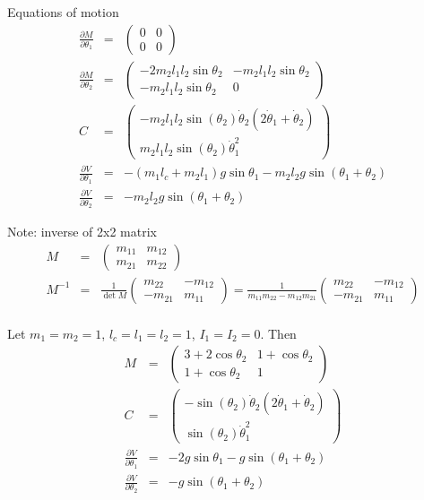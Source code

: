 \documentclass[a4paper]{article}
\begin{document}
Equations of motion
\begin{eqnarray*}
\frac{\partial M}{\partial \theta_1} &=&
\begin{pmatrix} 0 & 0\\0 & 0\end{pmatrix}\\
\frac{\partial M}{\partial \theta_2} &=& \begin{pmatrix}
-2 m_2 l_1 l_2 \sin \theta_2 & -m_2 l_1 l_2 \sin \theta_2\\
-m_2 l_1 l_2 \sin \theta_2 & 0\end{pmatrix}\\
C &=& \begin{pmatrix}
-m_2 l_1 l_2 \sin(\theta_2) \dot{\theta}_2 (2\dot{\theta}_1 + \dot{\theta}_2)\\
m_2 l_1 l_2 \sin(\theta_2) \dot{\theta}_1^2
\end{pmatrix}\\
\frac{\partial V}{\partial \theta_1} &=& -(m_1 l_c + m_2 l_1) g \sin \theta_1 - m_2 l_2 g \sin(\theta_1 + \theta_2)\\
\frac{\partial V}{\partial \theta_2} &=& -m_2 l_2 g \sin(\theta_1 + \theta_2)
\end{eqnarray*}

Note: inverse of 2x2 matrix
\begin{eqnarray*}
M &=& \begin{pmatrix}m_{11} & m_{12}\\m_{21} & m_{22}\end{pmatrix}\\
M^{-1} &=& \frac{1}{\det M}
\begin{pmatrix} m_{22} & -m_{12}\\-m_{21} & m_{11}\end{pmatrix}
= \frac{1}{m_{11} m_{22} - m_{12} m_{21}}
\begin{pmatrix} m_{22} & -m_{12}\\-m_{21} & m_{11}\end{pmatrix}\\
\end{eqnarray*}

Let $m_1 = m_2 = 1$, $l_c = l_1 = l_2 = 1$, $I_1 = I_2 = 0$. Then
\begin{eqnarray*}
M &=& \begin{pmatrix} 3 + 2 \cos{\theta_2}&
    1 + \cos{\theta_2}\\
    1 + \cos{\theta_2}&
    1\end{pmatrix}\\
C &=& \begin{pmatrix}
-\sin(\theta_2) \dot{\theta}_2 (2\dot{\theta}_1 + \dot{\theta}_2)\\
\sin(\theta_2) \dot{\theta}_1^2
\end{pmatrix}\\
\frac{\partial V}{\partial \theta_1} &=& -2 g \sin \theta_1 - g \sin(\theta_1 + \theta_2)\\
\frac{\partial V}{\partial \theta_2} &=& -g \sin(\theta_1 + \theta_2)
\end{eqnarray*}
\end{document}
